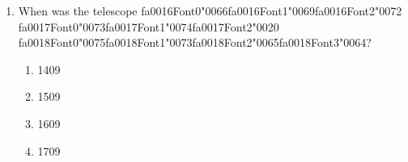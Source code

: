 \documentclass[12pt]{article}
\begin{document}
\begin{enumerate}[label=\arabic*.]
\item When was the telescope {\csname fa0016Font0\endcsname\char"0066}{\csname fa0016Font1\endcsname\char"0069}{\csname fa0016Font2\endcsname\char"0072} {\csname fa0017Font0\endcsname\char"0073}{\csname fa0017Font1\endcsname\char"0074}{\csname fa0017Font2\endcsname\char"0020} {\csname fa0018Font0\endcsname\char"0075}{\csname fa0018Font1\endcsname\char"0073}{\csname fa0018Font2\endcsname\char"0065}{\csname fa0018Font3\endcsname\char"0064}?
\begin{enumerate}[label=(\alph*)]
    \item 1409
    \item 1509
    \item 1609
    \item 1709
\end{enumerate}
\end{enumerate}
\end{document}
